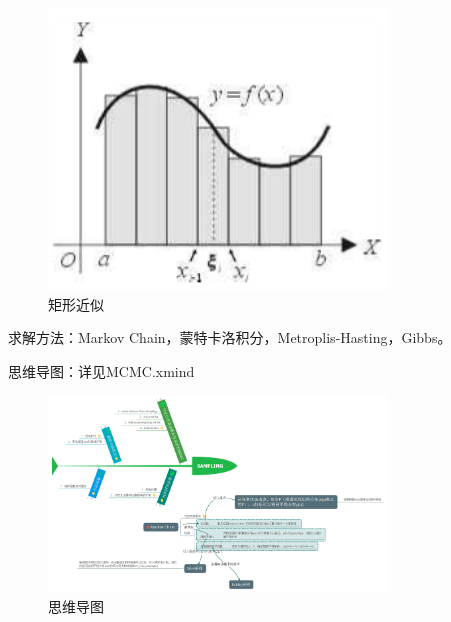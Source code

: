 \documentclass{ctexart}
\begin{document}
\begin{figure}[H]
\begin{center}
\includegraphics[width=0.8\textwidth]{fig/integration.png} %
\caption{矩形近似}
\end{center}
\end{figure}


求解方法：Markov Chain，蒙特卡洛积分，Metroplis-Hasting，Gibbs。

思维导图：详见MCMC.xmind
\begin{figure}[H]
\begin{center}
\includegraphics[width=0.8\textwidth]{fig/Sampling.png} %
\caption{思维导图}
\end{center}
\end{figure}


\end{document}
